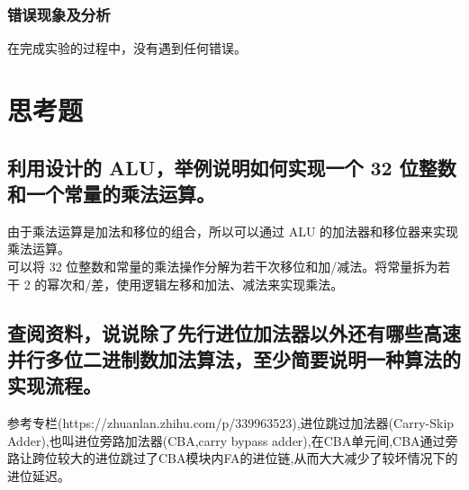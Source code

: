 \documentclass{article}
\begin{document}
    \subsubsection{错误现象及分析}
    在完成实验的过程中，没有遇到任何错误。  


    
    \section{思考题}

    \subsection{利用设计的 ALU，举例说明如何实现一个 32 位整数和一个常量的乘法运算。}
    由于乘法运算是加法和移位的组合，所以可以通过 ALU 的加法器和移位器来实现乘法运算。\\
    可以将 32 位整数和常量的乘法操作分解为若干次移位和加/减法。将常量拆为若干 2 的幂次和/差，使用逻辑左移和加法、减法来实现乘法。

    \subsection{查阅资料，说说除了先行进位加法器以外还有哪些高速并行多位二进制数加法算法，至少简要说明一种算法的实现流程。}
    参考专栏(https://zhuanlan.zhihu.com/p/339963523),进位跳过加法器(Carry-Skip Adder),也叫进位旁路加法器(CBA,carry bypass adder),在CBA单元间,CBA通过旁路让跨位较大的进位跳过了CBA模块内FA的进位链,从而大大减少了较坏情况下的进位延迟。
\end{document}
